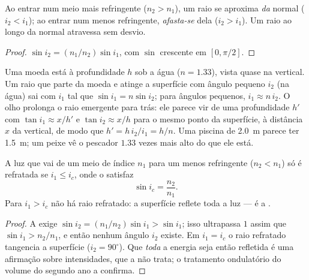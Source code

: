 \begin{proposition}\label{prop:b1:rays-reflection-refraction:bending}
Ao entrar num meio mais refringente ($n_2 > n_1$), um raio se aproxima
\emph{da} normal ($i_2 < i_1$); ao entrar num menos refringente,
\emph{afasta-se} dela ($i_2 > i_1$). Um raio ao longo da normal atravessa
sem desvio.
\end{proposition}

\begin{proof}
$\sin i_2 = (n_1/n_2)\sin i_1$, com $\sin$ crescente em
$[0, \pi/2]$.
\end{proof}

\begin{example}\label{ex:b1:rays-reflection-refraction:depth}
Uma moeda está à profundidade $h$ sob a água ($n = 1.33$), vista quase
na vertical. Um raio que parte da moeda e atinge a superfície com ângulo pequeno
$i_2$ (na água) sai com $i_1$ tal que $\sin i_1 = n\sin i_2$; para ângulos
pequenos, $i_1 \approx n\,i_2$. O olho prolonga o raio emergente para trás: ele
parece vir de uma profundidade $h'$ com $\tan i_1 \approx x/h'$ e
$\tan i_2 \approx x/h$ para o mesmo ponto da superfície, à distância $x$ da
vertical, de modo que $h' = h\,i_2/i_1 = h/n$. Uma piscina de \qty{2.0}{m} parece
ter \qty{1.5}{m}; um peixe vê o pescador $1.33$ vezes mais alto do que
ele está.
\end{example}

\begin{theorem}\label{thm:b1:rays-reflection-refraction:tir}
A luz que vai de um meio de índice $n_1$ para um menos refringente
($n_2 < n_1$) só é refratada se $i_1 \leq i_c$, onde o
\emph{} satisfaz
\[
\sin i_c = \frac{n_2}{n_1} .
\]
Para $i_1 > i_c$ não há raio refratado: a superfície reflete toda a
luz --- é a \emph{}.
\end{theorem}

\begin{proof}
A  exige $\sin i_2 = (n_1/n_2)\sin i_1 > \sin i_1$; isso
ultrapassa $1$ assim que $\sin i_1 > n_2/n_1$, e então nenhum ângulo $i_2$
existe. Em $i_1 = i_c$ o raio refratado tangencia a superfície
($i_2 = 90^\circ$). Que \emph{toda} a energia seja então refletida é uma
afirmação sobre intensidades, que a  não trata; o
tratamento ondulatório do volume do segundo ano a confirma.
\end{proof}


